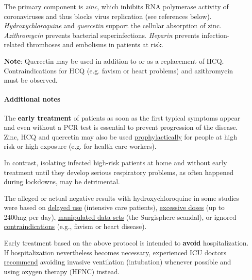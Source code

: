 The primary component is \emph{zinc}, which inhibits RNA polymerase
activity of coronaviruses and thus blocks virus replication (see
references below). \emph{Hydroxychloroquine} and \emph{quercetin}
support the cellular absorption of zinc. \emph{Azithromycin} prevents
bacterial superinfections. \emph{Heparin} prevents infection-related
thromboses and embolisms in patients at risk.

\textbf{Note}: Quercetin may be used in addition to or as a replacement
of HCQ. Contraindications for HCQ (e.g. favism or heart problems) and
azithromycin must be observed.

\hypertarget{additional-notes}{%
\paragraph{Additional notes}\label{additional-notes}}

The \textbf{early treatment} of patients as soon as the first typical
symptoms appear and even without a PCR test is essential to prevent
progression of the disease. Zinc, HCQ and quercetin may also be used
\href{https://www.mohfw.gov.in/pdf/AdvisoryontheuseofHydroxychloroquinasprophylaxisforSARSCoV2infection.pdf}{prophylactically}
for people at high risk or high exposure (e.g. for health care workers).

In contrast, isolating infected high-risk patients at home and without
early treatment until they develop serious respiratory problems, as
often happened during lockdowns, may be detrimental.

The alleged or actual negative results with hydroxychloroquine in some
studies were based on \href{https://c19study.com/}{delayed use}
(intensive care patients),
\href{http://www.francesoir.fr/politique-monde/oxford-recovery-et-solidarity-overdosage-two-clinical-trials-acts-considered}{excessive
doses} (up to 2400mg per day),
\href{https://www.theguardian.com/world/2020/jun/03/covid-19-surgisphere-who-world-health-organization-hydroxychloroquine}{manipulated
data sets} (the Surgisphere scandal), or ignored
\href{https://www.iss.it/documents/20126/0/Report+ISS+COVID-19_14.pdf/8a94daca-f6eb-ae95-dad7-68b9c03c8fb6}{contraindications}
(e.g., favism or heart disease).

Early treatment based on the above protocol is intended to
\textbf{avoid} hospitalization. If hospitalization nevertheless becomes
necessary, experienced ICU doctors
\href{https://www.evms.edu/covid-19/covid_care_for_clinicians/}{recommend}
avoiding invasive ventilation (intubation) whenever possible and using
oxygen therapy (HFNC) instead.

